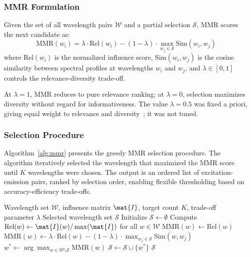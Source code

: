 \subsubsection{MMR Formulation}
Given the set of all wavelength pairs $\mathcal{W}$ and a partial selection $\mathcal{S}$, MMR scores the next candidate as:
\begin{equation}
\text{MMR}(w_i) = \lambda \cdot \text{Rel}(w_i) - (1 - \lambda) \cdot \max_{w_j \in \mathcal{S}} \text{Sim}(w_i, w_j)
\label{eq:mmr}
\end{equation}
where $\text{Rel}(w_i)$ is the normalized influence score, $\text{Sim}(w_i, w_j)$ is the cosine similarity between spectral profiles at wavelengths $w_i$ and $w_j$, and $\lambda \in [0, 1]$ controls the relevance-diversity trade-off.

At $\lambda = 1$, MMR reduces to pure relevance ranking; at $\lambda = 0$, selection maximizes diversity without regard for informativeness.
The value $\lambda = 0.5$ was fixed a priori, giving equal weight to relevance and diversity~\cite{carbonell1998use}; it was not tuned.

\subsubsection{Selection Procedure}
Algorithm~\ref{alg:mmr} presents the greedy MMR selection procedure.
The algorithm iteratively selected the wavelength that maximized the MMR score until $K$ wavelengths were chosen.
The output is an ordered list of excitation-emission pairs, ranked by selection order, enabling flexible thresholding based on accuracy-efficiency trade-offs.

\begin{algorithm}[t]
\caption{MMR Wavelength Selection}
\label{alg:mmr}
\begin{algorithmic}[1]
\REQUIRE Wavelength set $\mathcal{W}$, influence matrix $\mat{I}$, target count $K$, trade-off parameter $\lambda$
\ENSURE Selected wavelength set $\mathcal{S}$
\STATE Initialize $\mathcal{S} \gets \emptyset$
\STATE Compute $\text{Rel}(w) \gets \mat{I}(w) / \max(\mat{I})$ for all $w \in \mathcal{W}$
            \STATE $\text{MMR}(w) \gets \text{Rel}(w)$
        \ELSE
            \STATE $\text{MMR}(w) \gets \lambda \cdot \text{Rel}(w) - (1-\lambda) \cdot \max_{w_j \in \mathcal{S}} \text{Sim}(w, w_j)$
        \ENDIF
    \ENDFOR
    \STATE $w^* \gets \arg\max_{w \in \mathcal{W} \setminus \mathcal{S}} \text{MMR}(w)$
    \STATE $\mathcal{S} \gets \mathcal{S} \cup \{w^*\}$
\ENDFOR
\RETURN $\mathcal{S}$
\end{algorithmic}
\end{algorithm}

